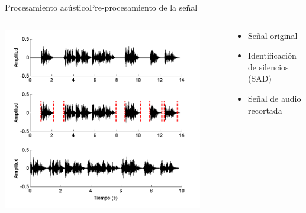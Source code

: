 \begin{frame}{Procesamiento acústico}{Pre-procesamiento de la señal}
  \small {
  \vspace{0mm} 
  \begin{columns} 
    \begin{column}{0.6\textwidth} 
      \hfill 
      \includegraphics[width=0.9\textwidth]{gfx/filename51}
    \end{column}
    \begin{column}{0.4\textwidth}
      \vspace{-8mm}
      \begin{itemize}
        \setlength{\itemindent}{-2em}      
        \itemsep 4.6em    
        \item Señal original
        \item Identificación de silencios (SAD)
        \item Señal de audio recortada
      \end{itemize}
    \end{column}   
  \end{columns}   
  }
\end{frame}


